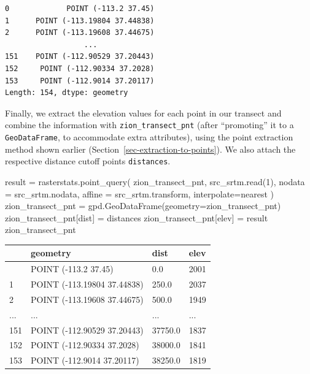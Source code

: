 \documentclass[
  letterpaper,
]{krantz}
\newenvironment{Shaded}{\begin{snugshade}}{\end{snugshade}}
\newcommand{\DecValTok}[1]{\textcolor[rgb]{0.68,0.00,0.00}{#1}}
\newcommand{\NormalTok}[1]{\textcolor[rgb]{0.00,0.23,0.31}{#1}}
\newcommand{\OperatorTok}[1]{\textcolor[rgb]{0.37,0.37,0.37}{#1}}
\newcommand{\StringTok}[1]{\textcolor[rgb]{0.13,0.47,0.30}{#1}}
\begin{document}
\begin{verbatim}
0             POINT (-113.2 37.45)
1      POINT (-113.19804 37.44838)
2      POINT (-113.19608 37.44675)
                  ...             
151    POINT (-112.90529 37.20443)
152     POINT (-112.90334 37.2028)
153     POINT (-112.9014 37.20117)
Length: 154, dtype: geometry
\end{verbatim}

Finally, we extract the elevation values for each point in our transect
and combine the information with \texttt{zion\_transect\_pnt} (after
``promoting'' it to a \texttt{GeoDataFrame}, to accommodate extra
attributes), using the point extraction method shown earlier
(Section~\ref{sec-extraction-to-points}). We also attach the respective
distance cutoff points \texttt{distances}.

\begin{Shaded}
\begin{Highlighting}[]
\NormalTok{result }\OperatorTok{=}\NormalTok{ rasterstats.point\_query(}
\NormalTok{    zion\_transect\_pnt, }
\NormalTok{    src\_srtm.read(}\DecValTok{1}\NormalTok{), }
\NormalTok{    nodata }\OperatorTok{=}\NormalTok{ src\_srtm.nodata, }
\NormalTok{    affine }\OperatorTok{=}\NormalTok{ src\_srtm.transform,}
\NormalTok{    interpolate}\OperatorTok{=}\StringTok{\textquotesingle{}nearest\textquotesingle{}}
\NormalTok{)}
\NormalTok{zion\_transect\_pnt }\OperatorTok{=}\NormalTok{ gpd.GeoDataFrame(geometry}\OperatorTok{=}\NormalTok{zion\_transect\_pnt)}
\NormalTok{zion\_transect\_pnt[}\StringTok{\textquotesingle{}dist\textquotesingle{}}\NormalTok{] }\OperatorTok{=}\NormalTok{ distances}
\NormalTok{zion\_transect\_pnt[}\StringTok{\textquotesingle{}elev\textquotesingle{}}\NormalTok{] }\OperatorTok{=}\NormalTok{ result}
\NormalTok{zion\_transect\_pnt}
\end{Highlighting}
\end{Shaded}

\begin{longtable}[]{@{}llll@{}}
\toprule\noalign{}
& geometry & dist & elev \\
\midrule\noalign{}
\endhead
\bottomrule\noalign{}
\endlastfoot
0 & POINT (-113.2 37.45) & 0.0 & 2001 \\
1 & POINT (-113.19804 37.44838) & 250.0 & 2037 \\
2 & POINT (-113.19608 37.44675) & 500.0 & 1949 \\
... & ... & ... & ... \\
151 & POINT (-112.90529 37.20443) & 37750.0 & 1837 \\
152 & POINT (-112.90334 37.2028) & 38000.0 & 1841 \\
153 & POINT (-112.9014 37.20117) & 38250.0 & 1819 \\
\end{longtable}
\end{document}
